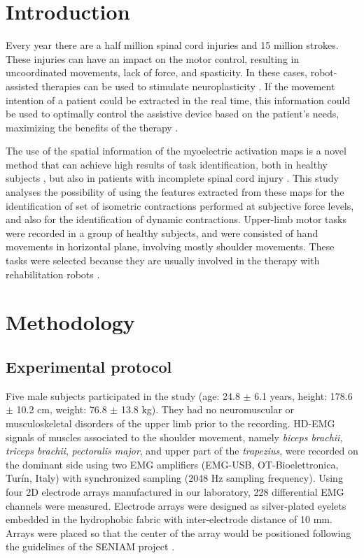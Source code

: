 \section{Introduction}
Every year there are a half million spinal cord injuries and 15 million strokes. These injuries can have an impact on the motor control, resulting in uncoordinated movements, lack of force, and spasticity. In these cases, robot-assisted therapies can be used to stimulate neuroplasticity \citep{vanPepen2004}. If the movement intention of a patient could be extracted in the real time, this information could be used to optimally control the assistive device based on the patient's needs, maximizing the benefits of the therapy \citep{Hogan2006}.

The use of the spatial information of the myoelectric activation maps is a novel method that can achieve high results of task identification, both in healthy subjects \citep{Stango2015}, but also in patients with incomplete spinal cord injury \citep{Rojas-Martinez2013, Jordanic2016a, Jordanic2016b}. This study analyses the possibility of using the features extracted from these maps for the identification of set of isometric contractions performed at subjective force levels, and also for the identification of dynamic contractions. Upper-limb motor tasks were recorded in a group of healthy subjects, and were consisted of hand movements in horizontal plane, involving mostly shoulder movements. These tasks were selected because they are usually involved in the therapy with rehabilitation robots \citep{Badesa2014}.


\section{Methodology}

\subsection{Experimental protocol}
Five male subjects participated in the study (age: 24.8 $\pm$ 6.1 years, height: 178.6 $\pm$ 10.2 cm, weight: 76.8 $\pm$ 13.8 kg). They had no neuromuscular or musculoskeletal disorders of the upper limb prior to the recording. HD-EMG signals of muscles associated to the shoulder movement, namely \textit{biceps brachii}, \textit{triceps brachii}, \textit{pectoralis major}, and upper part of the \textit{trapezius}, were recorded on the dominant side using two EMG amplifiers (EMG-USB, OT-Bioelettronica, Tur\'in, Italy) with synchronized sampling (2048 Hz sampling frequency). Using four 2D electrode arrays manufactured in our laboratory, 228 differential EMG channels were measured. Electrode arrays were designed as silver-plated eyelets embedded in the hydrophobic fabric with inter-electrode distance of 10 mm. Arrays were placed so that the center of the array would be positioned following the guidelines of the SENIAM project \citep{Hermens1999}.


